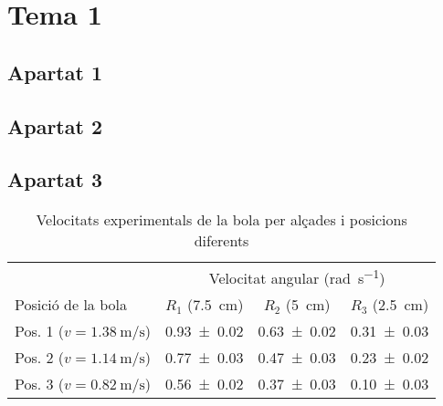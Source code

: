 \section{Tema 1}
\subsection{Apartat 1}

\subsection{Apartat 2}

\subsection{Apartat 3}


\begin{table}[H]
	\centering
	\begin{tabular}{l c c c}
		\toprule
		\toprule
		& \multicolumn{3}{c}{Velocitat angular (\si{\radian\per\s})} \\
		\cmidrule(l){2-4}
		Posició de la bola & $R_{1}$ (\SI{7.5}{\cm}) & $R_{2}$ (\SI{5}{\cm}) & $R_{3}$ (\SI{2.5}{\cm}) \\
		\midrule
		Pos. 1 ($v = \SI{1.38}{\m\per\s}$) & \num{0.93 \pm 0.02} & \num{0.63 \pm 0.02} & \num{0.31 \pm 0.03} \\
		Pos. 2 ($v = \SI{1.14}{\m\per\s}$) & \num{0.77 \pm 0.03} & \num{0.47 \pm 0.03} & \num{0.23 \pm 0.02} \\
		Pos. 3 ($v = \SI{0.82}{\m\per\s}$) & \num{0.56 \pm 0.02} & \num{0.37 \pm 0.03} & \num{0.10 \pm 0.03} \\
		\bottomrule
	\end{tabular}
	\caption{Velocitats experimentals de la bola per alçades i posicions diferents}
	\label{tab:vel-bola-exp}
\end{table}

